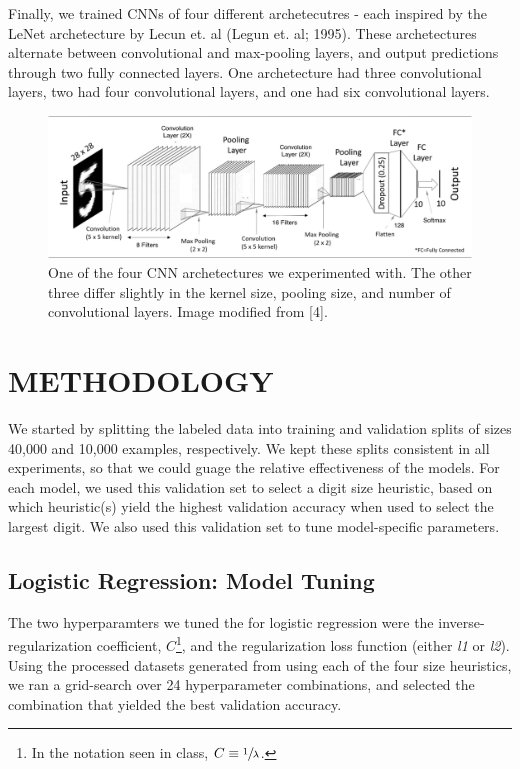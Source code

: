 \documentclass[letterpaper, 10 pt, conference]{ieeeconf}  %
\begin{document}
Finally, we trained CNNs of four different archetecutres - each inspired by the LeNet archetecture by Lecun et. al (Legun et. al; 1995). These archetectures alternate between convolutional and max-pooling layers, and output predictions through two fully connected layers. One archetecture had three convolutional layers, two had four convolutional layers, and one had six convolutional layers. 
\begin{figure}[H]
      \centering
      \includegraphics[scale = .42]{conv4_arch}
		\centering
      \caption{One of the four CNN archetectures we experimented with. The other three differ slightly in the kernel size, pooling size, and number of convolutional layers. Image modified from [4]. }
      \label{figurelabel}
\end{figure}

\section{METHODOLOGY}

We started by splitting the labeled data into training and validation splits of sizes 40,000 and 10,000 examples, respectively. We kept these splits consistent in all experiments, so that we could guage the relative effectiveness of the models. For each model, we used this validation set to select a digit size heuristic, based on which heuristic(s) yield the highest validation accuracy when used to select the largest digit. We also used this validation set to tune model-specific parameters.

\subsection{Logistic Regression: Model Tuning} 

The two hyperparamters we tuned the for logistic regression were the inverse-regularization coefficient, $C$\footnote{In the notation seen in class, $C \equiv \sfrac{1}{\lambda}$.}, and the regularization loss function (either \emph{l1} or \emph{l2}). Using the processed datasets generated from using each of the four size heuristics, we ran a grid-search over 24 hyperparameter combinations, and selected the combination that yielded the best validation accuracy.   
\end{document}
